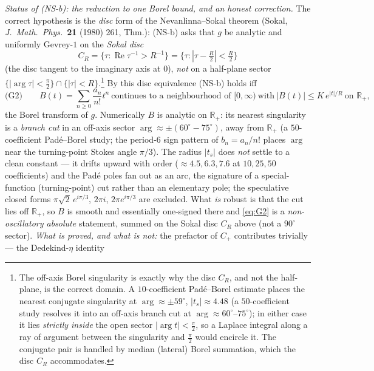 \noindent\emph{Status of \textup{(NS-b)}: the reduction to one Borel bound, and an honest correction.} The correct
hypothesis is the \emph{disc} form of the Nevanlinna--Sokal theorem (Sokal, \emph{J.~Math.~Phys.}~\textbf{21}
(1980) 261, Thm.): (NS-b) asks that $g$ be analytic and uniformly Gevrey-$1$ on the \emph{Sokal disc}
\[
  C_R=\{\tau:\operatorname{Re}\tau^{-1}>R^{-1}\}=\{\tau:|\tau-\tfrac R2|<\tfrac R2\}
\]
(the disc tangent to the imaginary axis at $0$), \emph{not} on a half-plane sector
$\{|\arg\tau|<\tfrac\pi2\}\cap\{|\tau|<R\}$.\footnote{The off-axis Borel singularity is exactly why the disc $C_R$,
and not the half-plane, is the correct domain. A $10$-coefficient Pad\'e--Borel estimate places the nearest
conjugate singularity at $\arg\approx\pm59^\circ$, $|t_s|\approx4.48$ (a $50$-coefficient study resolves it into an
off-axis branch cut at $\arg\approx60^\circ$--$75^\circ$); in either case it lies \emph{strictly inside} the open
sector $|\arg t|<\tfrac\pi2$, so a Laplace integral along a ray of argument between the singularity and $\tfrac\pi2$
would encircle it. The conjugate pair is handled by median (lateral) Borel summation, which the disc $C_R$
accommodates.} By this disc equivalence (NS-b) holds iff
\begin{equation}\label{eq:G2}
  \text{(G2)}\qquad B(t)=\sum_{n\ge0}\frac{a_n}{n!}t^n\ \text{continues to a neighbourhood of }[0,\infty)\ \text{with}\
  |B(t)|\le K\,e^{|t|/R}\ \text{on }\mathbb R_+ ,
\end{equation}
the Borel transform of $g$. Numerically $B$ is analytic on $\mathbb R_+$: its nearest singularity is a
\emph{branch cut} in an off-axis sector $\arg\approx\pm(60^\circ\!-\!75^\circ)$, away from $\mathbb R_+$ (a
$50$-coefficient Pad\'e--Borel study; the period-$6$ sign pattern of $b_n=a_n/n!$ places $\arg$ near the
turning-point Stokes angle $\pi/3$). The radius $|t_s|$ does \emph{not} settle to a clean constant --- it drifts
upward with order ($\approx4.5,6.3,7.6$ at $10,25,50$ coefficients) and the Pad\'e poles fan out as an arc, the
signature of a special-function (turning-point) cut rather than an elementary pole; the speculative closed forms
$\pi\sqrt2\,e^{i\pi/3}$, $2\pi i$, $2\pi e^{i\pi/3}$ are excluded. What \emph{is} robust is that the cut lies off
$\mathbb R_+$, so $B$ is smooth and essentially one-signed there and \eqref{eq:G2} is a \emph{non-oscillatory
absolute} statement, summed on the Sokal disc $C_R$ above (not a $90^\circ$ sector). \emph{What is proved, and what is not:} the prefactor of
$C_+$ contributes trivially --- the Dedekind-$\eta$ identity
